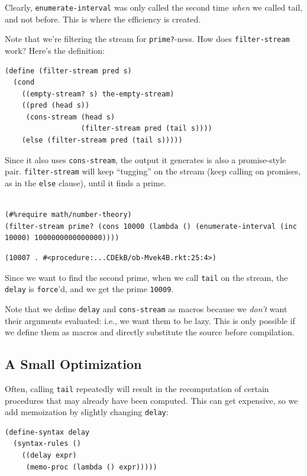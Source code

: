 \documentclass[9pt]{report}
\begin{document}
Clearly, \texttt{enumerate-interval} was only called the second time
\emph{when} we called tail, and not before. This is where the efficiency
is created.

Note that we're filtering the stream for \texttt{prime?}-ness. How does
\texttt{filter-stream} work? Here's the definition:

\begin{verbatim}
(define (filter-stream pred s)
  (cond
    ((empty-stream? s) the-empty-stream)
    ((pred (head s))
     (cons-stream (head s)
                  (filter-stream pred (tail s))))
    (else (filter-stream pred (tail s)))))
\end{verbatim}

Since it also uses \texttt{cons-stream}, the output it generates is also a
promise-style pair. \texttt{filter-stream} will keep ``tugging'' on the
stream (keep calling on promises, as in the \texttt{else} clause), until
it finds a prime.

\begin{verbatim}

(#%require math/number-theory)
(filter-stream prime? (cons 10000 (lambda () (enumerate-interval (inc 10000) 1000000000000000))))
\end{verbatim}

\begin{verbatim}
(10007 . #<procedure:...CDEkB/ob-Mvek4B.rkt:25:4>)
\end{verbatim}


Since we want to find the second prime, when we call \texttt{tail} on the
stream, the \texttt{delay} is \texttt{force}'d, and we get the prime \texttt{10009}.

Note that we define \texttt{delay} and \texttt{cons-stream} as macros because we
\emph{don't} want their arguments evaluated: i.e., we want them to be
lazy. This is only possible if we define them as macros and
directly substitute the source before compilation.

\subsection{A Small Optimization}
\label{sec:orgda4a9f6}

Often, calling \texttt{tail} repeatedly will result in the recomputation
of certain procedures that may already have been computed. This
can get expensive, so we add memoization by slightly changing
\texttt{delay}:
\begin{verbatim}
(define-syntax delay
  (syntax-rules ()
    ((delay expr)
     (memo-proc (lambda () expr)))))
\end{verbatim}
\end{document}

